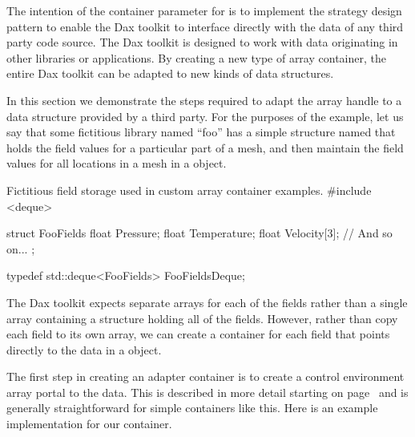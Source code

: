 
The intention of the container parameter for  is to
implement the strategy design pattern to enable the Dax toolkit
to interface directly with the data of any third party code source. The Dax
toolkit is designed to work with data originating in other libraries or
applications. By creating a new type of array container, the entire Dax
toolkit can be adapted to new kinds of data structures.

In this section we demonstrate the steps required to adapt the array handle
to a data structure provided by a third party. For the purposes of the
example, let us say that some fictitious library named ``foo'' has a simple
structure named  that holds the field values for a
particular part of a mesh, and then maintain the field values for all
locations in a mesh in a  object.

\begin{daxexample}{Fictitious field storage used in custom array container examples.}
#include <deque>

struct FooFields {
  float Pressure;
  float Temperature;
  float Velocity[3];
  // And so on...
};

typedef std::deque<FooFields> FooFieldsDeque;
\end{daxexample}

The Dax toolkit expects separate arrays for each of the fields rather than
a single array containing a structure holding all of the fields. However,
rather than copy each field to its own array, we can create a container for
each field that points directly to the data in a 
object.

The first step in creating an adapter container is to create a control
environment array portal to the data. This is described in more detail
starting on page~\pageref{sec:ArrayPortals} and is generally
straightforward for simple containers like this. Here is an example
implementation for our  container.

